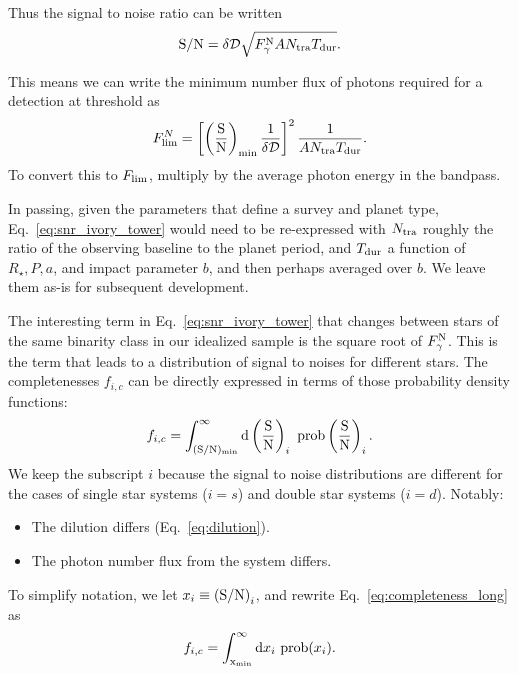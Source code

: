 \documentclass{emulateapj}
\begin{document}
Thus the signal to noise ratio can be written
\begin{equation}
{\rm S/N} = \delta \mathcal{D} \sqrt{F^{\rm N}_\gamma A N_{\rm tra} T_{\rm 
dur}}.
\label{eq:snr_ivory_tower}
\end{equation}

This means we can write the minimum number flux of photons required for a 
detection at threshold as
\begin{equation}
F_{\rm lim}^N = \left[ \left({\rm \frac{S}{N}}\right)_{\rm min} \frac{1}{\delta 
	\mathcal{D}} \right]^2 \frac{1}{A N_{\rm tra} T_{\rm dur}}.
\end{equation}
To convert this to $F_{\rm lim}$, multiply by the average photon energy in the 
bandpass.

In passing, given the parameters that define a survey and planet type, 
Eq.~\ref{eq:snr_ivory_tower} would need to be re-expressed with 
$N_{\rm tra}$ roughly the ratio of the observing baseline to the planet period, 
and $T_{\rm dur}$ a function of $R_\star, P, a$, and impact parameter $b$, and 
then perhaps averaged over $b$. We leave them as-is for subsequent 
development.

The interesting term in Eq.~\ref{eq:snr_ivory_tower} that changes between stars 
of the same binarity class in our idealized sample is the square root of 
$F^{\rm N}_\gamma$.
This is the term that leads to a distribution of signal to noises for different 
stars.
The completenesses $f_{i,c}$ can be directly 
expressed in terms of those probability density functions:
\begin{equation}
f_{i,c} = 
	\int_{{\rm (S/N)_{min}}}^{\infty} 
		{\rm d}\left(\frac{{\rm S}}{{\rm N}}\right)_i \ 
		{\rm prob}\left(\frac{{\rm S}}{{\rm N}}\right)_i.
\label{eq:completeness_long}
\end{equation}
We keep the subscript $i$ because the signal to noise distributions are 
different for the cases of single star systems ($i=s$) and double star systems 
($i=d$).
Notably:
\begin{itemize}
	\item The dilution differs (Eq.~\ref{eq:dilution}).
	\item The photon number flux from the system differs.
\end{itemize}

To simplify notation, we let $x_i \equiv {\rm (S/N)}_i$, and rewrite 
Eq.~\ref{eq:completeness_long} as
\begin{equation}
f_{i,c} = 
\int_{{\rm x_{\rm min}}}^{\infty} 
{\rm d}x_i \ 
{\rm prob}(x_i).
\label{eq:completeness_short}
\end{equation}
\end{document}
